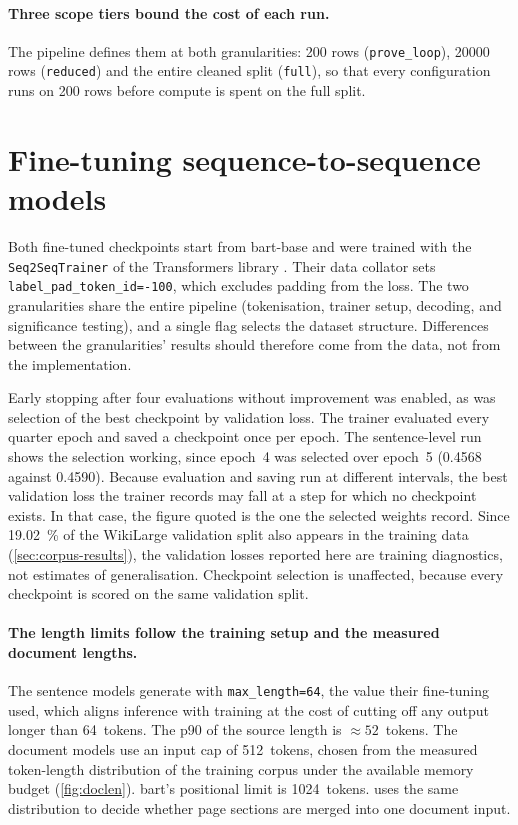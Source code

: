 \paragraph{Three scope tiers bound the cost of each run.}
The pipeline defines them at both granularities: \num{200} rows (\texttt{prove\_loop}), \num{20000} rows (\texttt{reduced}) and the entire cleaned split (\texttt{full}), so that every configuration runs on \num{200} rows before compute is spent on the full split.

\section{Fine-tuning sequence-to-sequence models}
\label{sec:finetuning}

Both fine-tuned checkpoints start from \gls{bart}-base \parencite[7872]{lewis-etal-2020-bart} and were trained with the \texttt{Seq2SeqTrainer} of the Transformers library \parencite{wolf-etal-2020-transformers}.
Their data collator sets \texttt{label\_pad\_token\_id=-100}, which excludes padding from the loss.
The two granularities share the entire pipeline (tokenisation, trainer setup, decoding, and significance testing), and a single flag selects the dataset structure.
Differences between the granularities' results should therefore come from the data, not from the implementation.

Early stopping after four evaluations without improvement was enabled, as was selection of the best checkpoint by validation loss.
The trainer evaluated every quarter epoch and saved a checkpoint once per epoch.
The sentence-level run shows the selection working, since epoch~4 was selected over epoch~5 (\num{0.4568} against \num{0.4590}).
Because evaluation and saving run at different intervals, the best validation loss the trainer records may fall at a step for which no checkpoint exists.
In that case, the figure quoted is the one the selected weights record.
Since \qty{19.02}{\percent} of the WikiLarge validation split also appears in the training data (\cref{sec:corpus-results}), the validation losses reported here are training diagnostics, not estimates of generalisation.
Checkpoint selection is unaffected, because every checkpoint is scored on the same validation split.

\paragraph{The length limits follow the training setup and the measured document lengths.}
The sentence models generate with \texttt{max\_length=64}, the value their fine-tuning used, which aligns inference with training at the cost of cutting off any output longer than 64~tokens.
The \gls{p90} of the source length is \({\approx}52\)~tokens.
The document models use an input cap of \num{512}~tokens, chosen from the measured token-length distribution of the training corpus under the available memory budget (\cref{fig:doclen}).
\Gls{bart}'s positional limit is \num{1024}~tokens.
 uses the same distribution to decide whether page sections are merged into one document input.

